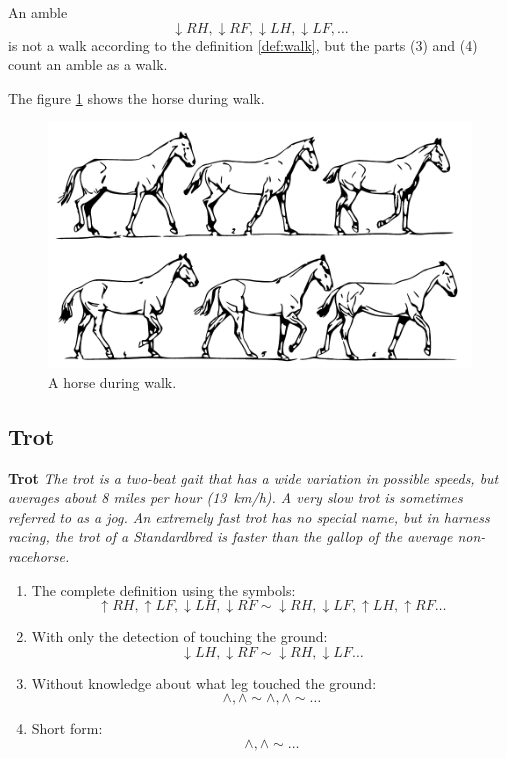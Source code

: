\begin{remark}
    An amble $$\downarrow RH, \downarrow RF, \downarrow LH, \downarrow LF, \dots$$ is not a walk according to the definition \ref{def:walk}, but the parts (3) and (4) count an amble as a walk.
\end{remark}

The figure \ref{fig:walk} shows the horse during walk.

\begin{figure}
	\centering
	\caption{A horse during walk. \cite{Duruttya2005}}
	\label{fig:walk}
	\includegraphics[width=\linewidth]{img/krok.pdf}
\end{figure}

\subsection{Trot}
\begin{definition}{\textbf{Trot}}
    \label{def:trot}
    \textit{The trot is a two-beat gait that has a wide variation in possible speeds, but averages about 8 miles per hour (\SI{13}{km/h}). A very slow trot is sometimes referred to as a jog. An extremely fast trot has no special name, but in harness racing, the trot of a Standardbred is faster than the gallop of the average non-racehorse.} \cite{Harrisc1993}
    
    \begin{enumerate}
        \item The complete definition using the symbols:
        $$ \uparrow RH, \uparrow LF, \downarrow LH, \downarrow RF \sim \downarrow RH, \downarrow LF, \uparrow LH, \uparrow RF \dots $$
        \item With only the detection of touching the ground:
        $$ \downarrow LH, \downarrow RF \sim \downarrow RH, \downarrow LF \dots $$
        \item Without knowledge about what leg touched the ground:
        $$ \wedge, \wedge \sim \wedge, \wedge \sim \dots $$
        \item Short form:
        $$ \wedge, \wedge \sim \dots $$
    \end{enumerate}
\end{definition}

